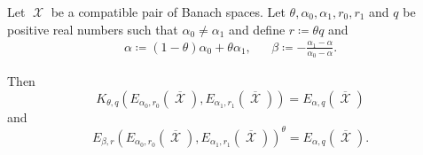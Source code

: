 \begin{theorem}\label{thm:interpolation_space_and_approximation_space_reiteration}
  Let \( \mscrX \) be a compatible pair of Banach spaces. Let \( \theta, \alpha_0, \alpha_1, r_0, r_1 \) and \( q \) be positive real numbers such that \( \alpha_0 \neq \alpha_1 \) and define \( r \coloneqq \theta q \) and
  \begin{align*}
    \alpha \coloneqq (1 - \theta) \alpha_0 + \theta \alpha_1,
    &&
    \beta \coloneqq - \frac {\alpha_1 - \alpha} {\alpha_0 - \alpha}.
  \end{align*}

  Then
  \begin{equation*}
    K_{\theta,q}(E_{\alpha_0,r_0}(\overline{\mscrX}), E_{\alpha_1,r_1}(\overline{\mscrX})) = E_{\alpha,q}(\overline{\mscrX})
  \end{equation*}
  and
  \begin{equation*}
    E_{\beta,r}(E_{\alpha_0,r_0}(\overline{\mscrX}), E_{\alpha_1,r_1}(\overline{\mscrX}))^\theta = E_{\alpha,q}(\overline{\mscrX}).
  \end{equation*}
\end{theorem}

